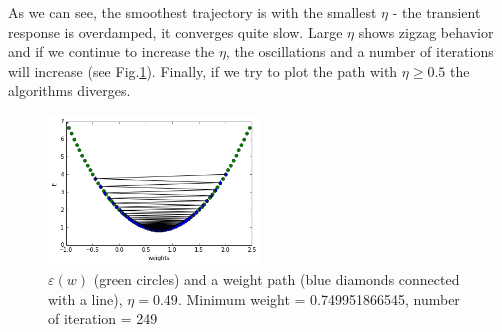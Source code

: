 \documentclass[a4paper, 12pt]{article}
\begin{document}
As we can see, the smoothest trajectory is with the smallest $\eta$ - the transient response is overdamped, it converges quite slow. Large $\eta$ shows zigzag behavior and if we continue to increase the $\eta$, the oscillations and a number of iterations will increase (see Fig.\ref{fig:EFunction049}). Finally, if we try to plot the path with $\eta \geqslant 0.5$ the algorithms diverges.

\begin{figure}[h]
  \centering
  \caption{$\varepsilon(w)$ (green circles) and a weight path (blue diamonds connected with a line), $\eta = 0.49$. Minimum weight = 0.749951866545, number of iteration = 249  \label{fig:EFunction049}}
  \includegraphics[width=0.5\textwidth]{EFunction049}
\end{figure}
\end{document}
